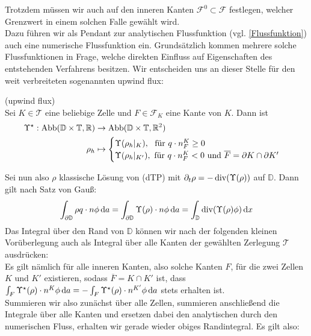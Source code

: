 Trotzdem müssen wir auch auf den inneren Kanten $ \mathcal{F}^0 \subset \mathcal{F} $ festlegen, welcher Grenzwert in einem solchen Falle gewählt wird. \\
Dazu führen wir als Pendant zur analytischen Flussfunktion (vgl. \ref{Flussfunktion})
auch eine numerische Flussfunktion ein. Grundsätzlich kommen mehrere solche Flussfunktionen in Frage, welche direkten Einfluss auf Eigenschaften des entstehenden Verfahrens besitzen. Wir entscheiden uns an dieser Stelle für den weit verbreiteten 
sogenannten upwind flux:
\begin{Definition}(upwind flux)\\
	Sei $K \in \mathcal{T}$ eine beliebige Zelle und $ F \in \mathcal{F}_K$ eine Kante von $K$. Dann ist
	\begin{align*}
		\Upsilon^{\star} : \text{Abb}(\mathbb{D}\times\mathbb{T},\mathbb{R}) &\to \text{Abb}(\mathbb{D}\times\mathbb{T},\mathbb{R}^2) \\
		\rho_h &\mapsto 
		\begin{cases}
			\Upsilon(\rho_h|_K) , \ \text{ für } q\cdot n_F^K \geq 0 \\  
			\Upsilon(\rho_h|_{K'}) ,\text{ für } q\cdot n_F^K < 0 \text{ und } \overline{F} = \partial K \cap \partial K'
		\end{cases}
	\end{align*}
\end{Definition}
Sei nun also $ \rho $ klassische Lösung von (dTP) mit $ \partial_t \rho = -\operatorname{div}(\Upsilon(\rho)) $ auf $ \mathbb{D} $. Dann gilt nach Satz von Gauß:
\begin{align}
		\label{gaus1}
		\int_{\partial \mathbb{D}} \rho q \cdot n \phi \, \mathrm{d} a  =\int_{\partial \mathbb{D}} \Upsilon(\rho) \cdot n \phi \, \mathrm{d} a = \int_{\mathbb{D}} \operatorname{div} (\Upsilon(\rho)\phi) \, \mathrm{d} x
\end{align}
Das Integral über den Rand von $ \mathbb{D} $ können wir nach der folgenden kleinen Vorüberlegung auch als Integral über alle Kanten der gewählten Zerlegung $ \mathcal{T} $ ausdrücken: \\
Es gilt nämlich für alle inneren Kanten, also solche Kanten $ F $, für die zwei Zellen $ K $ und $ K' $ existieren, sodass $ \overline{F} = K \cap K' $ ist, dass $ \int_F \Upsilon^{\star}(\rho) \cdot n^K \phi \, \mathrm{d} a = - \int_F \Upsilon^{\star}(\rho) \cdot n^{K'} \phi \, \mathrm{d} a $ stets erhalten ist. \\
Summieren wir also zunächst über alle Zellen, summieren anschließend die Integrale über alle Kanten und ersetzen dabei den analytischen durch den numerischen Fluss, erhalten wir gerade wieder obiges Randintegral. Es gilt also:
